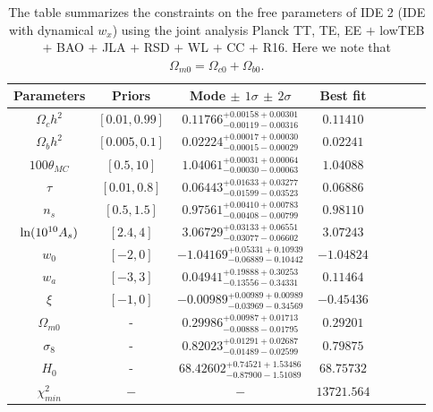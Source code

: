 \documentclass[superscriptaddress,oneolumn,secnumarabic,
amssymb,amsmath,nobibnotes,aps,prd,showpacs,nofootinbib]{revtex4}%
\begin{document}
\begingroup
\squeezetable
\begin{table}
\caption{The table summarizes the constraints on the free parameters of IDE 2 (IDE with dynamical $w_x$) using the joint analysis Planck TT, TE, EE $+$ lowTEB $+$ BAO $+$ JLA $+$ RSD $+$ WL $+$ CC $+$ R16. Here we note that $\Omega_{m0}= \Omega_{c0}+ \Omega_{b0}$.}
\begin{tabular}{cccccccc}
\hline\hline
Parameters & Priors & Mode $\pm$ $1\sigma$ $\pm$ $2\sigma$ & Best fit \\ \hline\hline
$\Omega_c h^2$ &  $[0.01, 0.99]$ & $0.11766_{-    0.00119-    0.00316}^{+    0.00158+    0.00301}$ &  $    0.11410$\\

$\Omega_b h^2$ & $[0.005, 0.1]$ & $0.02224_{-    0.00015-    0.00029}^{+    0.00017+    0.00030}$ &  $    0.02241$\\

$100\theta_{MC}$ &  $[0.5, 10]$ & $ 1.04061_{-    0.00030-    0.00063}^{+    0.00031+    0.00064}$ &  $    1.04088$\\

$\tau$ & $[0.01, 0.8]$ & $0.06443_{-    0.01599-    0.03523}^{+    0.01633+    0.03277}$  &  $    0.06886$\\

$n_s$ &  $[0.5, 1.5]$ & $0.97561_{-    0.00408-    0.00799}^{+    0.00410+    0.00783}$ & $    0.98110$\\

${\rm{ln}}(10^{10} A_s)$ &  $[2.4, 4]$ & $3.06729_{-    0.03077-    0.06602}^{+    0.03133+    0.06551}$  & $    3.07243$\\
\hline
$w_0$ & $[-2, 0]$ &  $-1.04169_{-    0.06889-    0.10442}^{+    0.05331+    0.10939}$ &  $   -1.04824$\\

$w_a$ & $[-3, 3]$ & $0.04941_{-    0.13556-    0.34331}^{+    0.19888+    0.30253}$ &  $    0.11464$\\

$\xi$ & $[-1, 0]$ & $-0.00989_{-    0.03969-    0.34569}^{+    0.00989+    0.00989}$ &  $   -0.45436$\\
\hline
$\Omega_{m0}$ & - & $ 0.29986_{-    0.00888-    0.01795}^{+    0.00987+    0.01713}$  & $    0.29201$\\

$\sigma_8$ & - & $0.82023_{-    0.01489-    0.02599}^{+    0.01291+    0.02687}$ &  $    0.79875$\\

$H_0$ & - & $68.42602_{-    0.87900-    1.51089}^{+    0.74521+    1.53486}$ & $   68.75732$\\
\hline
$\chi^2_{min}$ & $-$ & $-$ &  $13721.564$ \\
\hline
\end{tabular}
\label{tab:dynamicalw}
\end{table}
\endgroup
\end{document}
